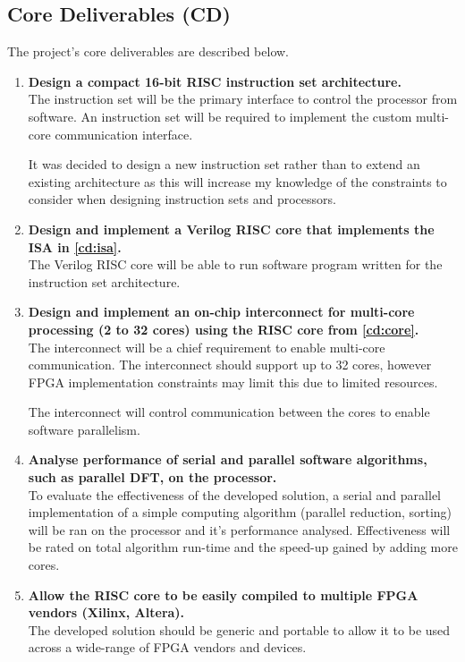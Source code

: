 \subsection{Core Deliverables (CD)}
The project's core deliverables are described below.
\begin{enumerate}[leftmargin=2\parindent, label=\bfseries CD\arabic*]
\item{\textbf{Design a compact 16-bit RISC instruction set architecture.}\\
The instruction set will be the primary interface to control the processor from software. An instruction set will be required to implement the custom multi-core communication interface.

It was decided to design a new instruction set rather than to extend an existing architecture as this will increase my knowledge of the constraints to consider when designing instruction sets and processors.
}
\label{cd:isa}

\item{\textbf{Design and implement a Verilog RISC core that implements the ISA in \ref{cd:isa}.}\\
The Verilog RISC core will be able to run software program written for the instruction set architecture.
}\label{cd:core}

\item{\textbf{Design and implement an on-chip interconnect for multi-core processing (2 to 32 cores) using the RISC core from \ref{cd:core}.}\\
The interconnect will be a chief requirement to enable multi-core communication. The interconnect should support up to 32 cores, however FPGA implementation constraints may limit this due to limited resources.

The interconnect will control communication between the cores to enable software parallelism.
}\label{cd:interconnect}

\item{\textbf{Analyse performance of serial and parallel software algorithms, such as parallel DFT, on the processor.}\\
To evaluate the effectiveness of the developed solution, a serial and parallel implementation of a simple computing algorithm (parallel reduction, sorting) will be ran on the processor and it's performance analysed. Effectiveness will be rated on total algorithm run-time and the speed-up gained by adding more cores.
}\label{cd:software}

\item{\textbf{Allow the RISC core to be easily compiled to multiple FPGA vendors (Xilinx, Altera).}\\
The developed solution should be generic and portable to allow it to be used across a wide-range of FPGA vendors and devices.

}
\end{enumerate}
